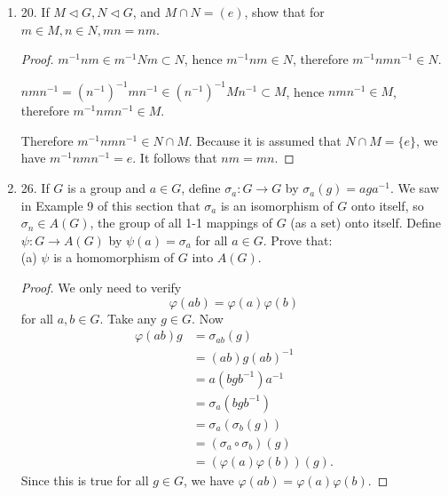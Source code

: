 \begin{enumerate}
\begin{correction}
	\begin{align*}
		x^{-1} \varphi(n) x &= \varphi(g)^{-1} \varphi(n) \varphi(g) \\
		&= \varphi(g^{-1} )\varphi(n)\varphi(g) \\
		&= \varphi(g^{-1} n)\varphi(g) \\
		&= \varphi(g^{-1} ng) \\
		&\in  \varphi(g^{-1} Ng) \\
		&= \varphi(N)
	.\end{align*}
\end{correction}

	\item 20. If $M  \triangleleft G, N \triangleleft  G$, and $M \cap N=(e)$, show that for $m \in M, n \in N, m n=n m$.
\begin{proof}
	$m^{-1} n m \in m^{-1} N m \subset N$, hence $m^{-1}  n m \in N$, therefore $m^{-1}  n m n^{-1}  \in N$.

	$n m n^{-1}  = (n^{-1} )^{-1} m n^{-1} \in (n^{-1} )^{-1}Mn^{-1} \subset M$, hence $n m n^{-1} \in M$, therefore $m^{-1}  n m n^{-1}  \in M$.

	Therefore $m^{-1}  n m n^{-1} \in  N \cap  M$. Because it is assumed that $ N \cap  M = \{e\} $, we have $ m^{-1}  n m n^{-1}  = e$. It follows that $n m = m n$.
\end{proof}

	\item 26. If $G$ is a group and $a \in G$, define $\sigma_a: G \rightarrow G$ by $\sigma_a(g)=a g a^{-1}$. We saw in Example 9 of this section that $\sigma_a$ is an isomorphism of $G$ onto itself, so $\sigma_n \in A(G)$, the group of all 1-1 mappings of $G$ (as a set) onto itself. Define $\psi: G \rightarrow A(G)$ by $\psi(a)=\sigma_a$ for all $a \in G$. Prove that:\\
(a) $\psi$ is a homomorphism of $G$ into $A(G)$.
\begin{proof}
	We only need to verify \[
		\varphi(ab) = \varphi(a)\varphi(b)
	\] 
	for all $a, b \in G$.
	Take any $ g \in G$. Now
	\begin{align*}
	\varphi(ab)g &= \sigma_{ab}(g) \\
	&= (ab)g(ab)^{-1} \\
	&= a(bgb^{-1} )a^{-1}  \\
	&= \sigma_a(bgb^{-1} ) \\
	&= \sigma_a(\sigma_b(g)) \\
	&= (\sigma_a\circ\sigma_b)(g)\\
	&= (\varphi(a)\varphi(b))(g)
	.\end{align*}
	Since this is true for all $g \in G$, we have $\varphi(ab) = \varphi(a)\varphi(b)$.
\end{proof}


\end{enumerate}
